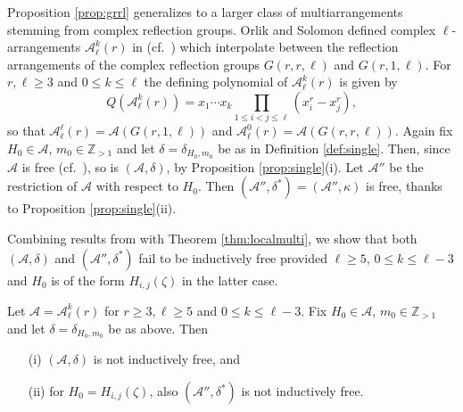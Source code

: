 Proposition \ref{prop:grrl} 
generalizes to a larger class of multiarrangements
stemming from complex reflection groups.
Orlik and Solomon defined 
complex $\ell$-arrangements ${{\mathcal A}}^k_\ell(r)$ in 
\cite[\S 2]{orliksolomon:unitaryreflectiongroups}
(cf.\ \cite[\S 6.4]{orlikterao:arrangements}) which
interpolate between the
reflection arrangements of the complex reflection groups
$G(r,r,\ell)$ and $G(r,1,\ell)$. 
For $r, \ell \geq 3$ and $0 \leq k \leq \ell$ 
the defining polynomial of
${{\mathcal A}}^k_\ell(r)$ is given by
\[
Q({{\mathcal A}}^k_\ell(r)) = x_1 \cdots x_k\prod\limits_{1 \le i < j \le \ell}(x_i^r - x_j^r),
\]
so that 
${{\mathcal A}}^\ell_\ell(r) = {{\mathcal A}}(G(r,1,\ell))$ and 
${{\mathcal A}}^0_\ell(r) = {{\mathcal A}}(G(r,r,\ell))$. 
Again fix $H_0 \in {{\mathcal A}}$, $m_0 \in {{\mathbb Z}}_{> 1}$ and let 
$\delta = \delta_{H_0,m_0}$ be
as in Definition \ref{def:single}.
Then, since ${{\mathcal A}}$ is free
(cf.~\cite[Prop.\ 6.85]{orlikterao:arrangements}),
so is $({{\mathcal A}}, \delta)$, by 
Proposition \ref{prop:single}(i).
Let ${{\mathcal A}}''$ be the restriction of ${{\mathcal A}}$ with respect 
to $H_0$.
Then $({{\mathcal A}}'', \delta^*) =  ({{\mathcal A}}'', \kappa)$ is free, 
thanks to Proposition \ref{prop:single}(ii).

Combining results from \cite{hogeroehrle:indfree}
with Theorem \ref{thm:localmulti}, 
we show that both $({{\mathcal A}}, \delta)$ 
and $({{\mathcal A}}'', \delta^*)$
fail to be inductively free 
provided 
$\ell \ge 5$, $0 \le k \le \ell-3$
and $H_0$ is of the form $H_{i,j}(\zeta)$
in the latter case.

\begin{proposition}
\label{prop:akl}
Let ${{\mathcal A}} = {{\mathcal A}}^k_\ell(r)$ for $r \ge 3, \ell \ge 5$
and $0 \le k \le \ell-3$.
Fix $H_0 \in {{\mathcal A}}$, $m_0 \in {{\mathbb Z}}_{> 1}$ and let 
$\delta = \delta_{H_0,m_0}$ be as above. Then 
\begin{itemize}
\item[(i)] 
$({{\mathcal A}}, \delta)$ is not inductively free, and
\item[(ii)] 
for $H_0 = H_{i,j}(\zeta)$, also 
$({{\mathcal A}}'', \delta^*)$ is not inductively free. 
\end{itemize}
\end{proposition}

